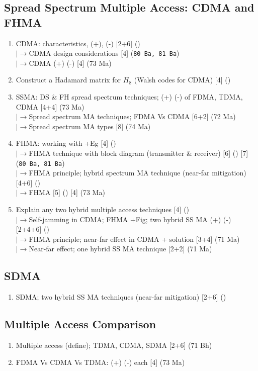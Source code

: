 \documentclass[12pt]{article}
\newcommand{\lb}{\\$\left|\rightarrow\right.$}
\begin{document}
  \subsection{Spread Spectrum Multiple Access: CDMA and FHMA}
    \begin{enumerate}[topsep=0pt, noitemsep]
      \item CDMA: characteristics, (+), (-) \hfill [2+6] ()
        \lb CDMA design considerations \hfill [4] (\texttt{80 Ba, 81 Ba})
        \lb CDMA (+) (-) \hfill [4] (73 Ma)
      \item Construct a Hadamard matrix for $H_8$ (Walsh codes for CDMA) \hfill [4] ()
      \item SSMA: DS \& FH spread spectrum techniques; (+) (-) of FDMA, TDMA, CDMA \hfill [4+4] (73 Ma)
        \lb Spread spectrum MA techniques; FDMA Vs CDMA \hfill [6+2] (72 Ma)
        \lb Spread spectrum MA types \hfill [8] (74 Ma)
      \item FHMA: working with +Eg \hfill [4] ()
        \lb FHMA technique with block diagram (transmitter \& receiver) \hfill [6] () [7] (\texttt{80 Ba, 81 Ba})
        \lb FHMA principle; hybrid spectrum MA technique (near-far mitigation) \hfill [4+6] ()
        \lb FHMA \hfill [5] () [4] (73 Ma)
      \item Explain any two hybrid multiple access techniques \hfill [4] ()
        \lb Self-jamming in CDMA; FHMA +Fig; two hybrid SS MA (+) (-) \hfill [2+4+6] ()
        \lb FHMA principle; near-far effect in CDMA + solution \hfill [3+4] (71 Ma)
        \lb Near-far effect; one hybrid SS MA technique \hfill [2+2] (71 Ma)
    \end{enumerate}

  \subsection{SDMA}
    \begin{enumerate}[topsep=0pt, noitemsep]
      \item SDMA; two hybrid SS MA techniques (near-far mitigation) \hfill [2+6] ()
    \end{enumerate}

  \subsection{Multiple Access Comparison}
    \begin{enumerate}[topsep=0pt, noitemsep]
      \item Multiple access (define); TDMA, CDMA, SDMA \hfill [2+6] (71 Bh)
      \item FDMA Vs CDMA Vs TDMA: (+) (-) each \hfill [4] (73 Ma)
    \end{enumerate}
\end{document}
